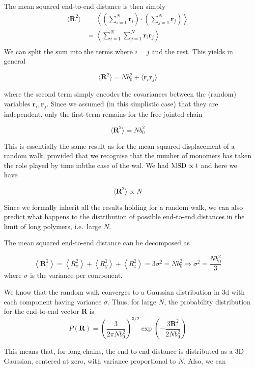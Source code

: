 \documentclass[
  letterpaper,
  enabledeprecatedfontcommands]{report}
\begin{document}
The mean squared end-to-end distance is then simply
\[\begin{aligned}\langle\mathbf{R}^2\rangle &= \left\langle \left( \sum_{i=1}^N \mathbf{r}_i\right) \cdot  \left( \sum_{j=1}^N \mathbf{r}_j\right) \right\rangle\\
&= \left\langle \sum_{i=1}^N \sum_{j=1}^N  \mathbf{r}_i \mathbf{r}_j \right\rangle\\
\end{aligned}\] We can split the sum into the terms where \(i=j\) and
the rest. This yields in general

\[\langle \mathbf{R}^2\rangle = Nb_0^2+\langle \mathbf{r}_i \mathbf{r}_j  \rangle\]

where the second term simply encodes the covariances between the
(random) variables \(\mathbf{r}_i,\mathbf{r}_j\). Since we assumed (in
this simplistic case) that they are independent, only the first term
remains for the free-jointed chain

\[\langle \mathbf{R}^2\rangle = Nb_0^2\]

This is essentially the same result as for the mean squared displacement
of a random walk, provided that we recognise that the number of monomers
has taken the role played by time inbthe case of the wal. We had
\({\rm MSD}\propto t\) and here we have

\[\langle \mathbf{R}^2\rangle\propto N\]

Since we formally inherit all the results holding for a random walk, we
can also predict what happens to the distribution of possible end-to-end
distances in the limit of long polymers, i.e.~large \(N\).

The mean squared end-to-end distance can be decomposed as

\[
\left\langle\mathbf{R}^2\right\rangle=\left\langle R_x^2\right\rangle+\left\langle R_y^2\right\rangle+\left\langle R_z^2\right\rangle=3 \sigma^2=N b_0^2 \Rightarrow \sigma^2=\frac{N b_0^2}{3}
\] where \(\sigma\) is the variance per component.

We know that the random walk converges to a Gaussian distribution in 3d
with each component having variance \(\sigma\). Thus, for large \(N\),
the probability distribution for the end-to-end vector \(\mathbf{R}\) is
\[
P(\mathbf{R}) = \left( \frac{3}{2\pi N b_0^2} \right)^{3/2} \exp\left( -\frac{3 \mathbf{R}^2}{2 N b_0^2} \right)
\]

This means that, for long chains, the end-to-end distance is distributed
as a 3D Gaussian, centered at zero, with variance proportional to \(N\).
Also, we can
\end{document}
